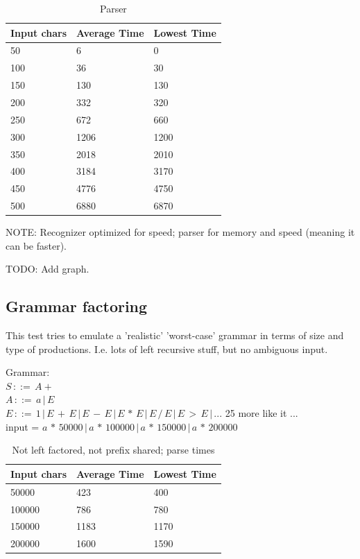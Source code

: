 \documentclass[a4paper,10pt]{article}
\begin{document}
\begin{table}[H]
\centering
\begin{tabular}{ | p{5em} | p{7em} | p{6em} | }
  \hline
  Input chars & Average Time & Lowest Time \\
  \hline
  50 & 6 & 0 \\
  100 & 36 & 30 \\
  150 & 130 & 130 \\
  200 & 332 & 320 \\
  250 & 672 & 660 \\
  300 & 1206 & 1200 \\
  350 & 2018 & 2010 \\
  400 & 3184 & 3170 \\
  450 & 4776 & 4750 \\
  500 & 6880 & 6870 \\
  \hline
\end{tabular}
\caption{Parser}
\end{table}

NOTE: Recognizer optimized for speed; parser for memory and speed (meaning it can be faster).

TODO: Add graph.

\subsection{Grammar factoring}

This test tries to emulate a 'realistic' 'worst-case' grammar in terms of size and type of productions. I.e. lots of left recursive stuff, but no ambiguous input.

Grammar:\\
$S\,::=\,A+$\\
$A\,::=\,a\,|\,E$\\
$E\,::=\,1\,|\,E\,+\,E\,|\,E\,-\,E\,|\,E\,*\,E\,|\,E\,/\,E\,|\,E\,>\,E\,|\,...$ 25 more like it ...\\
input = $a\,*\,50000\,|\,a\,*\,100000\,|\,a\,*\,150000\,|\,a\,*\,200000$

\begin{table}[H]
\centering
\begin{tabular}{ | p{5em} | p{7em} | p{6em} | }
  \hline
  Input chars & Average Time & Lowest Time \\
  \hline
  50000 & 423 & 400 \\
  100000 & 786 & 780 \\
  150000 & 1183 & 1170 \\
  200000 & 1600 & 1590 \\
  \hline
\end{tabular}
\caption{Not left factored, not prefix shared; parse times}
\end{table}
\end{document}
